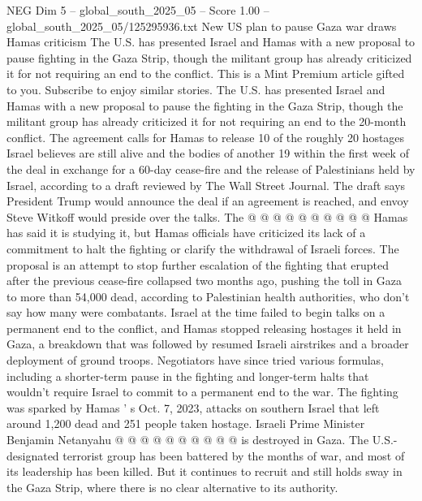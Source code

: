 \begin{textsample}{NEG Dim 5 – global\_south\_2025\_05 – Score 1.00 – global\_south\_2025\_05/125295936.txt}  \label{ex:f5_neg_340}
New US plan to pause Gaza war draws Hamas criticism The U.S. has presented Israel and Hamas with a new proposal to pause fighting in the Gaza Strip, though the militant group has already criticized it for not requiring an end to the conflict.
This is a Mint Premium article gifted to you.
Subscribe to enjoy similar stories.
The U.S. has presented Israel and Hamas with a new proposal to pause the fighting in the Gaza Strip, though the militant group has already criticized it for not requiring an end to the 20-month conflict.
The agreement calls for Hamas to release 10 of the roughly 20 hostages Israel believes are still alive and the bodies of another 19 within the first week of the deal in exchange for a 60-day cease-fire and the release of Palestinians held by Israel, according to a draft reviewed by The Wall Street Journal.
The draft says President Trump would announce the deal if an agreement is reached, and envoy Steve Witkoff would preside over the talks.
The @ @ @ @ @ @ @ @ @ @ Hamas has said it is studying it, but Hamas officials have criticized its lack of a commitment to halt the fighting or clarify the withdrawal of Israeli forces.
The proposal is an attempt to stop further escalation of the fighting that erupted after the previous cease-fire collapsed two months ago, pushing the toll in Gaza to more than 54,000 dead, according to Palestinian health authorities, who don't say how many were combatants.
Israel at the time failed to begin talks on a permanent end to the conflict, and Hamas stopped releasing hostages it held in Gaza, a breakdown that was followed by resumed Israeli airstrikes and a broader deployment of ground troops.
Negotiators have since tried various formulas, including a shorter-term pause in the fighting and longer-term halts that wouldn't require Israel to commit to a permanent end to the war.
The fighting was sparked by Hamas ' s Oct. 7, 2023, attacks on southern Israel that left around 1,200 dead and 251 people taken hostage.
Israeli Prime Minister Benjamin Netanyahu @ @ @ @ @ @ @ @ @ @ is destroyed in Gaza.
The U.S.-designated terrorist group has been battered by the months of war, and most of its leadership has been killed.
But it continues to recruit and still holds sway in the Gaza Strip, where there is no clear alternative to its authority.

\end{textsample}
